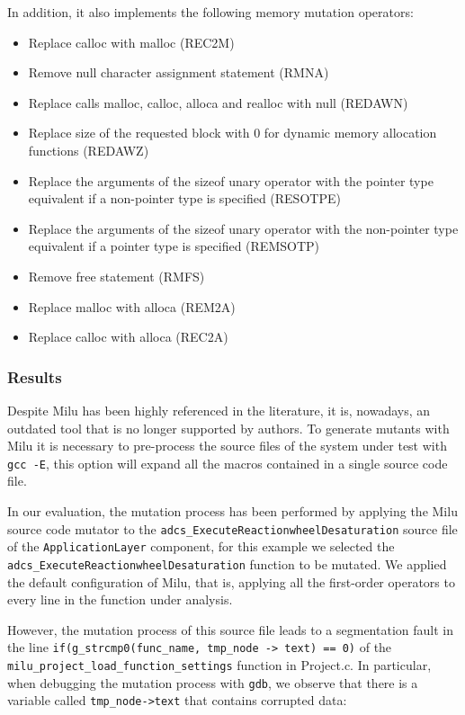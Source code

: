In addition, it also implements the following memory mutation operators:
\begin{itemize}
	\item Replace calloc with malloc (REC2M)
	\item Remove null character assignment statement (RMNA)
	\item Replace calls malloc, calloc, alloca and realloc with null (REDAWN)
	\item Replace size of the requested block with 0 for dynamic memory allocation functions
	(REDAWZ)
	\item Replace the arguments of the sizeof unary operator with the pointer type equivalent if a
	non-pointer type is specified (RESOTPE)
	\item Replace the arguments of the sizeof unary operator with the non-pointer type equivalent
	if a pointer type is specified (REMSOTP)
	\item Remove free statement (RMFS)
	\item Replace malloc with alloca (REM2A)
	\item Replace calloc with alloca (REC2A)
\end{itemize}


\subsubsection{Results}

Despite Milu has been highly referenced in the literature, it is, nowadays, an outdated tool that is no longer supported by authors.
To generate mutants with Milu it is necessary to pre-process the source files of the system under test with \texttt{gcc -E}, this option will expand all the macros contained in a single source code file.

In our evaluation, the mutation process has been performed by applying the Milu source code mutator to the \texttt{adcs\_ExecuteReactionwheelDesaturation} source file of the \texttt{ApplicationLayer} component, for this example we selected the
\texttt{adcs\_ExecuteReactionwheelDesaturation} function to be mutated. We applied the default configuration of Milu, that is, applying all the first-order operators to every line in the function under analysis.

However, the mutation process of this source file leads to a segmentation \linebreak fault in the line  \texttt{if(g\_strcmp0(func\_name, tmp\_node -> text) == 0)} of the \linebreak\texttt{milu\_project\_load\_function\_settings} function in Project.c. In particular, when debugging the mutation process with \texttt{gdb}, we observe that there is a variable called \texttt{tmp\_node->text} that contains corrupted data:

